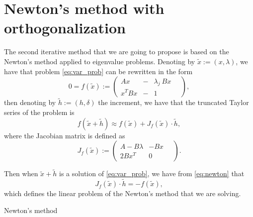 \documentclass[preprint,12pt]{elsarticle}
\begin{document}
\section{Newton's method with orthogonalization}\label{sec:newton}

The second iterative method that we are going to propose is based on the Newton's method applied to eigenvalue problems. Denoting by $\tilde x:=(x,\lambda)$, we have that problem \eqref{eq:var_prob} can be rewritten in the form
$$
0=f(\tilde x):=
\left(
\begin{array}{lcl}
A x&-& \lambda_j\ Bx
\\
  x^T Bx&-& 1
\end{array}\quad
\right) ,
$$
then denoting by $\tilde h:=(h, \delta)$ the increment, we have that the truncated Taylor series of the problem is
\begin{equation}\label{eq:newton}
f(\tilde x + \tilde h)\approx f(\tilde x) + J_f(\tilde x)\cdot \tilde h, 
\end{equation}
where the Jacobian matrix is defined as
$$
J_f(\tilde x):=
\left(
\begin{array}{lr}
A - B\lambda & -Bx
\\
  2Bx^T  & 0
\end{array}\quad
\right) .
$$

Then when $\tilde x + \tilde h$ is a solution of \eqref{eq:var_prob}, we have from \eqref{eq:newton}
that 
$$
J_f(\tilde x)\cdot \tilde h = - f(\tilde x),
$$
which defines the linear problem of the Newton's method that we are solving.
\begin{algorithm}[H] \caption{Newton's method} \label{alg:newton} 
\begin{algorithmic}


\REPEAT

\end{algorithmic}
\end{algorithm}
\end{document}
